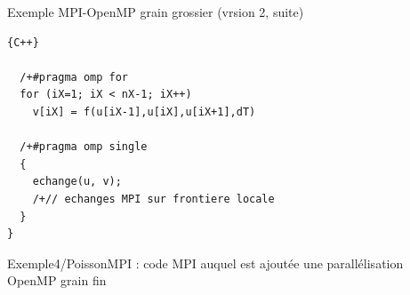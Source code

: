 \documentclass{beamer}
\begin{document}
\begin{frame}[fragile]
	Exemple MPI-OpenMP grain grossier (vrsion 2, suite)
	
	
	\begin{lstlisting}[firstnumber=14]{C++}
	
  /+#pragma omp for
  for (iX=1; iX < nX-1; iX++)
    v[iX] = f(u[iX-1],u[iX],u[iX+1],dT)

  /+#pragma omp single
  {
    echange(u, v);
    /+// echanges MPI sur frontiere locale    
  }
}
\end{lstlisting}
	
\end{frame}

\begin{frame}
Exemple4/PoissonMPI : code MPI auquel est ajoutée une parallélisation OpenMP grain fin
\end{frame}
\end{document}
